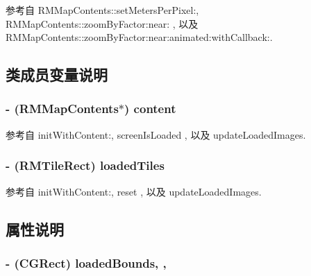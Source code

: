 参考自 R\-M\-Map\-Contents\-::set\-Meters\-Per\-Pixel\-:, R\-M\-Map\-Contents\-::zoom\-By\-Factor\-:near\-: , 以及 R\-M\-Map\-Contents\-::zoom\-By\-Factor\-:near\-:animated\-:with\-Callback\-:.



\subsection{类成员变量说明}
\hypertarget{interface_r_m_tile_loader_a34f9cbfb19977aaab0af4ae2411d78f5}{
\subsubsection[{content}]{\setlength{\rightskip}{0pt plus 5cm}-\/ ({\bf R\-M\-Map\-Contents}$\ast$) content\hspace{0.3cm}{\ttfamily [protected]}}}\label{interface_r_m_tile_loader_a34f9cbfb19977aaab0af4ae2411d78f5}


参考自 init\-With\-Content\-:, screen\-Is\-Loaded , 以及 update\-Loaded\-Images.

\hypertarget{interface_r_m_tile_loader_af70c80db2e48f8bbab5c316634dbd23c}{
\subsubsection[{loaded\-Tiles}]{\setlength{\rightskip}{0pt plus 5cm}-\/ ({\bf R\-M\-Tile\-Rect}) loaded\-Tiles\hspace{0.3cm}{\ttfamily [protected]}}}\label{interface_r_m_tile_loader_af70c80db2e48f8bbab5c316634dbd23c}


参考自 init\-With\-Content\-:, reset , 以及 update\-Loaded\-Images.



\subsection{属性说明}
\hypertarget{interface_r_m_tile_loader_a09cbc2e2aaac4bcd928499fd1ca6e78d}{
\subsubsection[{loaded\-Bounds}]{\setlength{\rightskip}{0pt plus 5cm}-\/ (C\-G\-Rect) loaded\-Bounds\hspace{0.3cm}{\ttfamily [read]}, {\ttfamily [nonatomic]}, {\ttfamily [assign]}}}\label{interface_r_m_tile_loader_a09cbc2e2aaac4bcd928499fd1ca6e78d}


